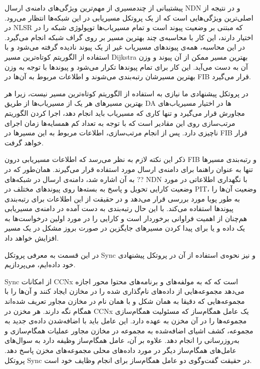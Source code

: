 \label{multipach}
پیشتیبانی از چندمسیری از مهم‌ترین ویژگی‌های دامنه‌ی ارسال NDN و در نتیجه از اصلی‌ترین ویژگی‌هایی است که از یک پروتکل مسیریابی در این شبکه‌ها انتظار می‌رود. در NLSR که مبتنی بر وضعیت پیوند است و تمام مسیریاب‌ها توپولوژی شبکه را در اختیار دارند، این کار با محاسبه‌ی چند بهترین مسیر بر روی گراف شبکه انجام می‌گیرد. در این محاسبه، همه‌ی پیوندهای مسیریاب غیر از یک پیوند نادیده گرفته می‌شود و با استفاده از الگوریتم کوتاه‌ترین مسیر Dijkstra بهترین مسیر ممکن از آن پیوند و وزن آن به دست می‌آید. این کار برای تمام پیوندها تکرار می‌شود و پیوندها با توجه به وزن بهترین مسیرشان رتبه‌بندی می‌شوند و اطلاعات مربوط به آن‌ها در FIB قرار می‌گیرد. 

در پروتکل پیشنهادی ما نیازی به استفاده از الگوریتم کوتاه‌ترین مسیر نیست، زیرا هر بهترین مسیرهای هر یک از مسیریاب‌ها از طریق DA ها در اختیار مسیریاب‌های مجاورش قرار می‌گیرد و تنها کاری که مسیریاب باید انجام دهد، اجرا کردن الگوریتم مرتب‌سازی روی این مقادیر است که با توجه به تعداد کم همسایه‌ها زمان اجرای ناچیزی دارد. پس از انجام مرتب‌سازی، اطلاعات مربوط به این مسیرها در FIB  قرار خواهد گرفت.

ذکر این نکته لازم به نظر می‌رسد که اطلاعات مسیریابی درون FIB و رتبه‌بندی مسیر‌ها تنها به عنوان راهنما برای دامنه‌ی ارسال مورد استفاده قرار می‌گیرند. همان‌طور که در ?? به آن اشاره شد، دامنه‌ی ارسال در شبکه‌های NDN با نگهداری اطلاعاتی در مورد وضعیت کارایی تحویل و پاسخ به بسته‌ها روی پیوند‌های مختلف در PIT، وضعیت آن‌ها را به طور پویا مورد بررسی قرار  می‌دهد و در حقیقت از این اطلاعات برای رتبه‌بندی پیوندها استفاده می‌کند. با این حال رتبه‌بندی به دست آمده در دامنه‌ی مسیریابی هم‌چنان از اهمیت فراوانی برخوردار است و کارایی را در مورد اولین درخواست‌ها به یک داده و یا برای پیدا کردن مسیرهای جایگزین در صورت بروز مشکل در یک مسیر افزایش خواهد داد.

\label{sync}
در این قسمت به معرفی پروتکل Sync و نیز نحوه‌ی استفاده از آن در پروتکل پیشنهادی خود داده‌ایم، می‌پردازیم.

Sync
 از امکانات CCNx است که که به مولفه‌های و برنامه‌های محتوا محور اجازه می‌دهد مجموعه‌هایی از داده‌های نام‌گذاری شده را در مخازن ایجاد کنند و آن‌ها را با مجموعه‌هایی که دقیقا به همان شکل و با همان نام در مخازن مجاور تعریف شده‌اند همگام نگه دارند. هر مخزن در CCNx یک عامل همگام‌ساز که مسئولیت همگام‌سازی مجموعه‌ها را در آن مخزن به عهده دارد. این عامل باید با اضافه‌شدن داده‌ی جدید به مجموعه، کشف اشیای اضافه‌شده به مجموعه در مخازن مجاور عملیات همگام‌سازی و به‌روزرسانی را انجام دهد. علاوه بر آن، عامل همگام‌ساز وظیفه دارد به سوال‌های عامل‌های همگام‌ساز دیگر 	در مورد داده‌های محلی مجموعه‌های مخزن پاسخ دهد. پروتکل Sync در حقیقت گفت‌وگوی دو عامل همگام‌ساز برای انجام وظایف خود است.

